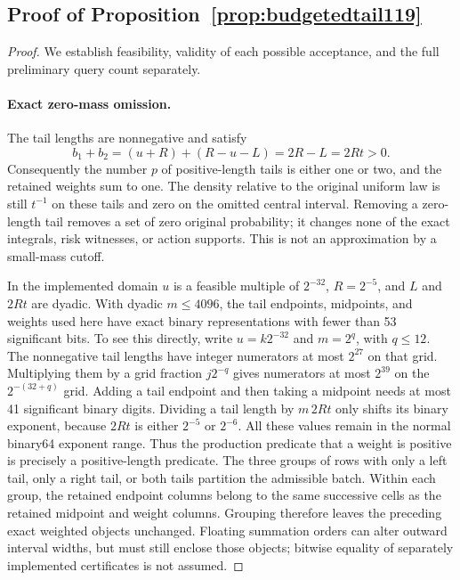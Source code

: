 \subsection{Proof of Proposition~\ref{prop:budgetedtail119}}
\begin{proof}
We establish feasibility, validity of each possible acceptance, and
the full preliminary query count separately.

\paragraph{Exact zero-mass omission.}
The tail lengths are nonnegative and satisfy
\[
 b_1+b_2=(u+R)+(R-u-L)=2R-L=2Rt>0.
\]
Consequently the number $p$ of positive-length tails is either one
or two, and the retained weights sum to one.  The density relative
to the original uniform law is still $t^{-1}$ on these tails and
zero on the omitted central interval.  Removing a zero-length tail
removes a set of zero original probability; it changes none of the
exact integrals, risk witnesses, or action supports.  This is not an
approximation by a small-mass cutoff.

In the implemented domain $u$ is a feasible multiple of $2^{-32}$,
$R=2^{-5}$, and $L$ and $2Rt$ are dyadic.  With dyadic $m\le4096$,
the tail endpoints, midpoints, and weights used here have exact
binary representations with fewer than 53 significant bits.  To see
this directly, write $u=k2^{-32}$ and $m=2^q$, with $q\le12$.
The nonnegative tail lengths have integer numerators at most $2^{27}$
on that grid.  Multiplying them by a grid fraction $j2^{-q}$ gives
numerators at most $2^{39}$ on the $2^{-(32+q)}$ grid.  Adding a
tail endpoint and then taking a midpoint needs at most 41 significant
binary digits.  Dividing a tail length by $m\,2Rt$ only shifts its
binary exponent, because $2Rt$ is either $2^{-5}$ or $2^{-6}$.
All these values remain in the normal binary64 exponent range.  Thus
the production predicate that a weight is positive is precisely a
positive-length predicate.  The three groups of rows with only a
left tail, only a right tail, or both tails partition the admissible
batch.  Within each group, the retained endpoint columns belong to
the same successive cells as the retained midpoint and weight
columns.  Grouping therefore leaves the preceding exact weighted
objects unchanged.  Floating summation orders can alter outward
interval widths, but must still enclose those objects; bitwise
equality of separately implemented certificates is not assumed.


\end{proof}
